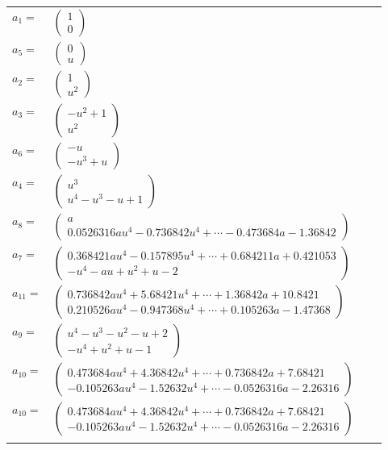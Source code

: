 \documentclass[1p]{elsarticle_modified}
\theoremstyle{definition}
\begin{document}
\begin{tabular}{m{7pt} m{180pt} m{7pt} m{180pt} }
\flushright $a_{1}=$&$\begin{pmatrix}1\\0\end{pmatrix}$ \\
\flushright $a_{5}=$&$\begin{pmatrix}0\\u\end{pmatrix}$ \\
\flushright $a_{2}=$&$\begin{pmatrix}1\\u^2\end{pmatrix}$ \\
\flushright $a_{3}=$&$\begin{pmatrix}- u^2+1\\u^2\end{pmatrix}$ \\
\flushright $a_{6}=$&$\begin{pmatrix}- u\\- u^3+u\end{pmatrix}$ \\
\flushright $a_{4}=$&$\begin{pmatrix}u^3\\u^4- u^3- u+1\end{pmatrix}$ \\
\flushright $a_{8}=$&$\begin{pmatrix}a\\0.0526316 a u^{4}-0.736842 u^{4}+\cdots-0.473684 a-1.36842\end{pmatrix}$ \\
\flushright $a_{7}=$&$\begin{pmatrix}0.368421 a u^{4}-0.157895 u^{4}+\cdots+0.684211 a+0.421053\\- u^4- a u+u^2+u-2\end{pmatrix}$ \\
\flushright $a_{11}=$&$\begin{pmatrix}0.736842 a u^{4}+5.68421 u^{4}+\cdots+1.36842 a+10.8421\\0.210526 a u^{4}-0.947368 u^{4}+\cdots+0.105263 a-1.47368\end{pmatrix}$ \\
\flushright $a_{9}=$&$\begin{pmatrix}u^4- u^3- u^2- u+2\\- u^4+u^2+u-1\end{pmatrix}$ \\
\flushright $a_{10}=$&$\begin{pmatrix}0.473684 a u^{4}+4.36842 u^{4}+\cdots+0.736842 a+7.68421\\-0.105263 a u^{4}-1.52632 u^{4}+\cdots-0.0526316 a-2.26316\end{pmatrix}$\\ \flushright $a_{10}=$&$\begin{pmatrix}0.473684 a u^{4}+4.36842 u^{4}+\cdots+0.736842 a+7.68421\\-0.105263 a u^{4}-1.52632 u^{4}+\cdots-0.0526316 a-2.26316\end{pmatrix}$\\&\end{tabular}
\end{document}
